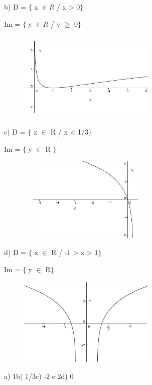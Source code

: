 \begin{respostas}{7}
b)
D = $ \{ $  x  \(  \in R \)  / x > 0$ \} $ 

Im = $ \{ $  y  \(  \in R \)  / y $ \geq $  0$ \} $ 

\begin{figure}[H]
	\begin{Center}
		\includegraphics[width=2.57in,height=1.69in]{capitulos/logaritmos_e_funcao_logaritmica/media/image35.JPG}
	\end{Center}
\end{figure}

c)
D = $ \{ $ x $ \in $ R / x < 1/3$ \} $ 

Im = $ \{ $  y $ \in $ R $ \} $ 

\begin{figure}[H]
	\begin{Center}
		\includegraphics[width=2.55in,height=1.6in]{capitulos/logaritmos_e_funcao_logaritmica/media/image36.JPG}
	\end{Center}
\end{figure}

d)
D = $ \{ $  x $ \in $ R / -1 > x > 1$ \} $

Im = $ \{ $  y $ \in $ R$ \} $

\begin{figure}[H]
	\begin{Center}
		\includegraphics[width=2.55in,height=1.66in]{capitulos/logaritmos_e_funcao_logaritmica/media/image37.JPG}
	\end{Center}
\end{figure}

\ansitem{}  a) 1\quad \quad b) 1/3\quad \quad c) -2 e 2\quad \quad d) 0

\end{respostas}

